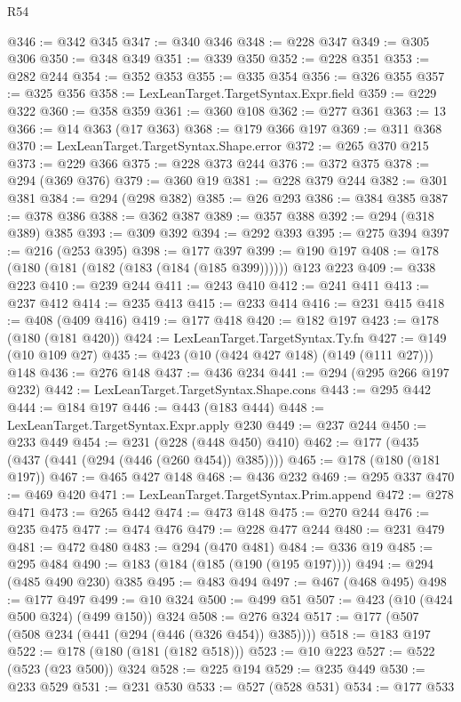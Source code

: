 \begin{lexlean}{R54}
\begin{coremodule}
@346 := @342 @345
@347 := @340 @346
@348 := @228 @347
@349 := @305 @306
@350 := @348 @349
@351 := @339 @350
@352 := @228 @351
@353 := @282 @244
@354 := @352 @353
@355 := @335 @354
@356 := @326 @355
@357 := @325 @356
@358 := LexLeanTarget.TargetSyntax.Expr.field
@359 := @229 @322
@360 := @358 @359
@361 := @360 @108
@362 := @277 @361
@363 := 13
@366 := @14 @363 (@17 @363)
@368 := @179 @366 @197
@369 := @311 @368
@370 := LexLeanTarget.TargetSyntax.Shape.error
@372 := @265 @370 @215
@373 := @229 @366
@375 := @228 @373 @244
@376 := @372 @375
@378 := @294 (@369 @376)
@379 := @360 @19
@381 := @228 @379 @244
@382 := @301 @381
@384 := @294 (@298 @382)
@385 := @26 @293
@386 := @384 @385
@387 := @378 @386
@388 := @362 @387
@389 := @357 @388
@392 := @294 (@318 @389) @385
@393 := @309 @392
@394 := @292 @393
@395 := @275 @394
@397 := @216 (@253 @395)
@398 := @177 @397
@399 := @190 @197
@408 := @178 (@180 (@181 (@182 (@183 (@184 (@185 @399)))))) @123 @223
@409 := @338 @223
@410 := @239 @244
@411 := @243 @410
@412 := @241 @411
@413 := @237 @412
@414 := @235 @413
@415 := @233 @414
@416 := @231 @415
@418 := @408 (@409 @416)
@419 := @177 @418
@420 := @182 @197
@423 := @178 (@180 (@181 @420))
@424 := LexLeanTarget.TargetSyntax.Ty.fn
@427 := @149 (@10 @109 @27)
@435 := @423 (@10 (@424 @427 @148) (@149 (@111 @27))) @148
@436 := @276 @148
@437 := @436 @234
@441 := @294 (@295 @266 @197 @232)
@442 := LexLeanTarget.TargetSyntax.Shape.cons
@443 := @295 @442
@444 := @184 @197
@446 := @443 (@183 @444)
@448 := LexLeanTarget.TargetSyntax.Expr.apply @230
@449 := @237 @244
@450 := @233 @449
@454 := @231 (@228 (@448 @450) @410)
@462 := @177 (@435 (@437 (@441 (@294 (@446 (@260 @454)) @385))))
@465 := @178 (@180 (@181 @197))
@467 := @465 @427 @148
@468 := @436 @232
@469 := @295 @337
@470 := @469 @420
@471 := LexLeanTarget.TargetSyntax.Prim.append
@472 := @278 @471
@473 := @265 @442
@474 := @473 @148
@475 := @270 @244
@476 := @235 @475
@477 := @474 @476
@479 := @228 @477 @244
@480 := @231 @479
@481 := @472 @480
@483 := @294 (@470 @481)
@484 := @336 @19
@485 := @295 @484
@490 := @183 (@184 (@185 (@190 (@195 @197))))
@494 := @294 (@485 @490 @230) @385
@495 := @483 @494
@497 := @467 (@468 @495)
@498 := @177 @497
@499 := @10 @324
@500 := @499 @51
@507 := @423 (@10 (@424 @500 @324) (@499 @150)) @324
@508 := @276 @324
@517 := @177 (@507 (@508 @234 (@441 (@294 (@446 (@326 @454)) @385))))
@518 := @183 @197
@522 := @178 (@180 (@181 (@182 @518)))
@523 := @10 @223
@527 := @522 (@523 (@23 @500)) @324
@528 := @225 @194
@529 := @235 @449
@530 := @233 @529
@531 := @231 @530
@533 := @527 (@528 @531)
@534 := @177 @533

\end{coremodule}
\end{lexlean}
